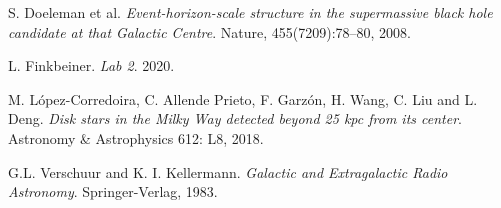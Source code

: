 \documentclass[12pt]{article}
\begin{document}
\begin{thebibliography}{4}

S. Doeleman et al.
\textit{Event-horizon-scale structure in the supermassive black hole candidate at that Galactic Centre}.
Nature, 455(7209):78–80, 2008.

L. Finkbeiner.
\textit{Lab 2}.
2020.

M. L\'{o}pez-Corredoira, C. Allende Prieto, F. Garzón, H. Wang, C. Liu and L. Deng.
\textit{Disk stars in the Milky Way detected beyond 25 kpc from its center}.
Astronomy \& Astrophysics 612: L8, 2018.

G.L. Verschuur and K. I. Kellermann. 
\textit{Galactic and Extragalactic Radio Astronomy}. 
Springer-Verlag, 1983.

\end{thebibliography}
\end{document}

